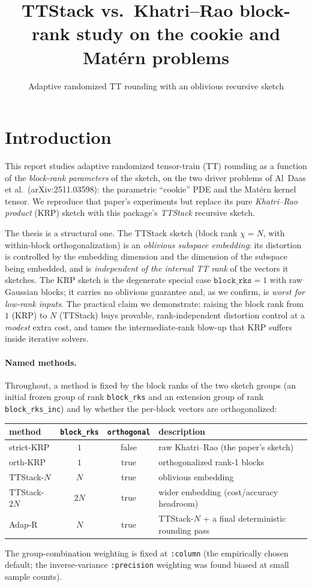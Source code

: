\documentclass[10pt,a4paper]{article}
\title{TTStack vs.\ Khatri--Rao block-rank study on the cookie and Mat\'ern problems}
\author{Adaptive randomized TT rounding with an oblivious recursive sketch}
\date{}
\begin{document}
\maketitle

\section{Introduction}

This report studies adaptive randomized tensor-train (TT) rounding as a function of the
\emph{block-rank parameters} of the sketch, on the two driver problems of Al~Daas et al.\
(arXiv:2511.03598): the parametric ``cookie'' PDE and the Mat\'ern kernel tensor. We reproduce that
paper's experiments but replace its pure \emph{Khatri--Rao product} (KRP) sketch with this package's
\emph{TTStack} recursive sketch.

The thesis is a structural one. The TTStack sketch (block rank $\chi\!=\!N$, with within-block
orthogonalization) is an \emph{oblivious subspace embedding}: its distortion is controlled by the
embedding dimension and the dimension of the subspace being embedded, and is \emph{independent of the
internal TT rank} of the vectors it sketches. The KRP sketch is the degenerate special case
$\texttt{block\_rks}=1$ with raw Gaussian blocks; it carries no oblivious guarantee and, as we
confirm, is \emph{worst for low-rank inputs}. The practical claim we demonstrate: raising the block
rank from $1$ (KRP) to $N$ (TTStack) buys provable, rank-independent distortion control at a
\emph{modest} extra cost, and tames the intermediate-rank blow-up that KRP suffers inside iterative
solvers.

\paragraph{Named methods.} Throughout, a method is fixed by the block ranks of the two sketch
groups (an initial frozen group of rank \texttt{block\_rks} and an extension group of rank
\texttt{block\_rks\_inc}) and by whether the per-block vectors are orthogonalized:
\begin{center}
\begin{tabular}{@{}lccl@{}}
\toprule
method & \texttt{block\_rks} & \texttt{orthogonal} & description \\
\midrule
strict-KRP  & $1$   & false & raw Khatri--Rao (the paper's sketch) \\
orth-KRP    & $1$   & true  & orthogonalized rank-1 blocks \\
TTStack-$N$ & $N$   & true  & oblivious embedding \\
TTStack-$2N$& $2N$  & true  & wider embedding (cost/accuracy headroom) \\
Adap-R      & $N$   & true  & TTStack-$N$ + a final deterministic rounding pass \\
\bottomrule
\end{tabular}
\end{center}
The group-combination weighting is fixed at \texttt{:column} (the empirically chosen default; the
inverse-variance \texttt{:precision} weighting was found biased at small sample counts).
\end{document}
